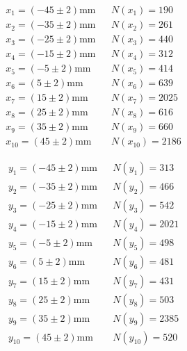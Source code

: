 \documentclass[12pt,a4paper]{scrartcl}
\numberwithin{equation}{section} %
\newcommand{\pu}[1]{\ensuremath{\mathrm{#1}}}
\renewcommand{\[}{} %
\renewcommand{\]}{\noindent} %
\begin{document}
\begin{align*}
    &x_1 = \pu{(-45\pm2) mm} &&
        N(x_1) = 190 \\
    &x_2 = \pu{(-35\pm2) mm} &&
        N(x_2) = 261 \\
    &x_3 = \pu{(-25\pm2) mm} &&
        N(x_3) = 440 \\
    &x_4 = \pu{(-15\pm2) mm} &&
        N(x_4) = 312 \\
    &x_5 = \pu{(-5\pm2) mm} &&
        N(x_5) = 414 \\
    &x_6 = \pu{(5\pm2) mm} &&
        N(x_6) = 639 \\
    &x_7 = \pu{(15\pm2) mm} &&
        N(x_7) = 2025 \\
    &x_8 = \pu{(25\pm2) mm} &&
        N(x_8) = 616 \\
    &x_9 = \pu{(35\pm2) mm} &&
        N(x_9) = 660 \\
    &x_{10} = \pu{(45\pm2) mm} &&
        N(x_{10}) = 2186
\end{align*}

\begin{align*}
    &y_1 = \pu{(-45\pm2) mm} &&
        N(y_1) = 313 \\
    &y_2 = \pu{(-35\pm2) mm} &&
        N(y_2) = 466 \\
    &y_3 = \pu{(-25\pm2) mm} &&
        N(y_3) = 542 \\
    &y_4 = \pu{(-15\pm2) mm} &&
        N(y_4) = 2021 \\
    &y_5 = \pu{(-5\pm2) mm} &&
        N(y_5) = 498 \\
    &y_6 = \pu{(5\pm2) mm} &&
        N(y_6) = 481 \\
    &y_7 = \pu{(15\pm2) mm} &&
        N(y_7) = 431 \\
    &y_8 = \pu{(25\pm2) mm} &&
        N(y_8) = 503 \\
    &y_9 = \pu{(35\pm2) mm} &&
        N(y_9) = 2385 \\
    &y_{10} = \pu{(45\pm2) mm} &&
        N(y_{10}) = 520
\end{align*}
\end{document}
